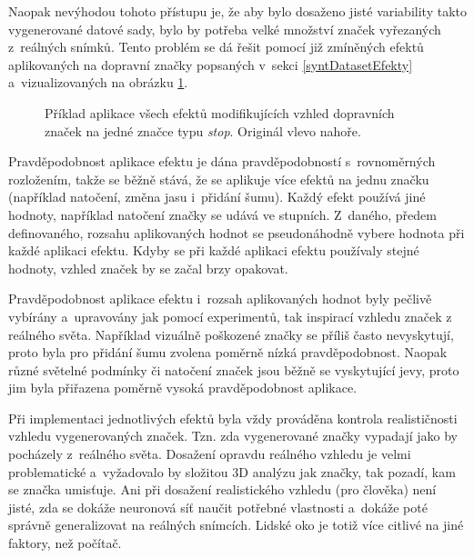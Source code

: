 Naopak nevýhodou tohoto přístupu je, že aby bylo dosaženo jisté variability takto vygenerované datové sady, bylo by potřeba velké množství značek vyřezaných z~reálných snímků. Tento problém se dá řešit pomocí již zmíněných efektů aplikovaných na dopravní značky popsaných v~sekci \ref{syntDatasetEfekty} a~vizualizovaných na obrázku \ref{fig:stopImplementace}.

\begin{figure}[H]
    \centering
    \caption{Příklad aplikace všech efektů modifikujících vzhled dopravních značek na jedné značce typu \emph{stop}. Originál vlevo nahoře.}
    \label{fig:stopImplementace}
\end{figure}

Pravděpodobnost aplikace efektu je dána pravděpodobností s~rovnoměrných rozložením, takže se běžně stává, že se aplikuje více efektů na jednu značku (například natočení, změna jasu i~přidání šumu). Každý efekt používá jiné hodnoty, například natočení značky se udává ve stupních. Z~daného, předem definovaného, rozsahu aplikovaných hodnot se pseudonáhodně vybere hodnota při každé aplikaci efektu. Kdyby se při každé aplikaci efektu používaly stejné hodnoty, vzhled značek by se začal brzy opakovat.

Pravděpodobnost aplikace efektu i~rozsah aplikovaných hodnot byly pečlivě vybírány a~upravovány jak pomocí experimentů, tak inspirací vzhledu značek z reálného světa. Například vizuálně poškozené značky se příliš často nevyskytují, proto byla pro přidání šumu zvolena poměrně nízká pravděpodobnost. Naopak různé světelné podmínky či natočení značek jsou běžně se vyskytující jevy, proto jim byla přiřazena poměrně vysoká pravděpodobnost aplikace.

Při implementaci jednotlivých efektů byla vždy prováděna kontrola realističnosti vzhledu vygenerovaných značek. Tzn. zda vygenerované značky vypadají jako by pocházely z~reálného světa. Dosažení opravdu reálného vzhledu je velmi problematické a~vyžadovalo by složitou 3D analýzu jak značky, tak pozadí, kam se značka umisťuje. Ani při dosažení realistického vzhledu (pro člověka) není jisté, zda se dokáže neuronová síť naučit potřebné vlastnosti a~dokáže poté správně generalizovat na reálných snímcích. Lidské oko je totiž více citlivé na jiné faktory, než počítač.

